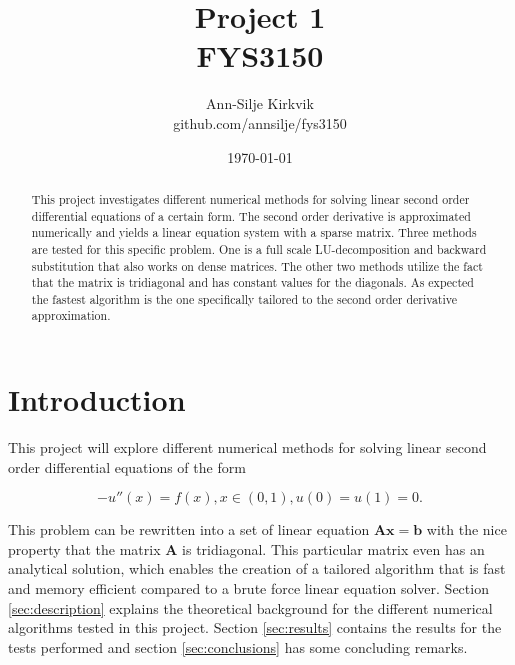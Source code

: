 \documentclass{article}
\begin{document}
\title{\vspace{1cm}Project 1 \\ FYS3150}

\author{\vspace{1cm}Ann-Silje Kirkvik \\ github.com/annsilje/fys3150}
\date{\vspace{5cm}\today}

\maketitle

\newpage

\begin{abstract}
This project investigates different numerical methods for solving linear second order differential equations of a certain form. The second order derivative is approximated numerically and yields a linear equation system with a sparse matrix. Three methods are tested for this specific problem. One is a full scale LU-decomposition and backward substitution that also works on dense matrices. The other two methods utilize the fact that the matrix is tridiagonal and has constant values for the diagonals. As expected the fastest algorithm is the one specifically tailored to the second order derivative approximation. 
\end{abstract}

\vspace{1cm}

\section{Introduction}
This project will explore different numerical methods for solving linear second order differential equations of the form

\begin{equation}
\label{eq:diff_eq}
-u''(x) = f(x), x \in(0,1), u(0) = u(1) = 0.
\end{equation}

This problem can be rewritten into a set of linear equation $\bm{A}\bm{x}=\bm{b}$ with the nice property that the matrix $\bm{A}$ is tridiagonal. This particular matrix even has an analytical solution, which enables the creation of a tailored algorithm that is fast and memory efficient compared to a brute force linear equation solver. Section \ref{sec:description} explains the theoretical background for the different numerical algorithms tested in this project. Section \ref{sec:results} contains the results for the tests performed and section \ref{sec:conclusions} has some concluding remarks.
\end{document}
